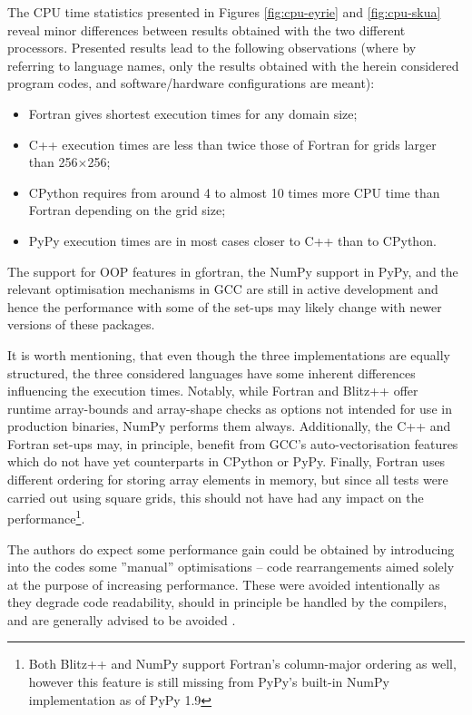 \documentclass[final,5p,times,twocolumn]{elsarticle}
\begin{document}
  The CPU time statistics presented in Figures \ref{fig:cpu-eyrie} and \ref{fig:cpu-skua} reveal
    minor differences between results obtained with the two different processors.
  Presented results lead to the following observations
    (where by referring to language names, only the results obtained with the herein considered
     program codes, and software/hardware configurations are meant):
  \begin{itemize}
    \item{Fortran gives shortest execution times for any domain size;}
    \item{C++ execution times are less than twice those of Fortran for grids larger than 
      256$\times$256;}
    \item{CPython requires from around 4 to almost 10 times more CPU time than Fortran depending on the grid size;}
    \item{PyPy execution times are in most cases closer to C++ than to CPython.}
  \end{itemize}
  The support for OOP features in gfortran, the NumPy support in PyPy, and the relevant optimisation
    mechanisms in GCC are still in active development and hence the performance with some of the set-ups may 
    likely change with newer versions of these packages. 

  It is worth mentioning, that even though the three implementations are equally structured,
    the three considered languages have some inherent differences influencing the execution times.
  Notably, while Fortran and Blitz++ offer runtime array-bounds and array-shape checks as options
    not intended for use in production binaries, NumPy performs them always.
  Additionally, the C++ and Fortran set-ups may, in principle, benefit from GCC's auto-vectorisation
    features which do not have yet counterparts in CPython or PyPy.
  Finally, Fortran uses different ordering for storing array elements in memory, but since
    all tests were carried out using square grids, this should not have had any impact on the
    performance\footnote{Both Blitz++ and NumPy support Fortran's column-major ordering as well, 
    however this feature is still missing from PyPy's built-in NumPy implementation as of PyPy 1.9}.

  The authors do expect some performance gain could 
    be obtained by introducing into the codes some ''manual'' optimisations -- 
    code rearrangements aimed solely at the purpose of increasing performance.
  These were avoided intentionally as they degrade code readability,
    should in principle be handled by the compilers,
    and are generally advised to be avoided \citep[e.g.][section 3.12]{bib_CERNcpp}.
\end{document}
